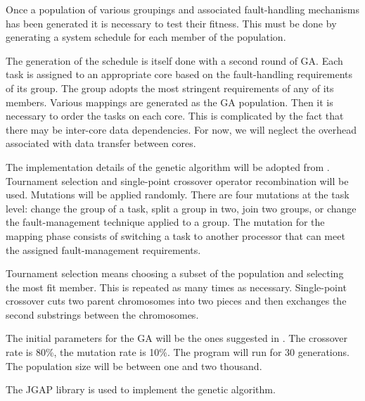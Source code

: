 Once a population of various groupings and associated fault-handling mechanisms has been generated it is necessary to test their fitness. This must be done by generating a system schedule for each member of the population. 

The generation of the schedule is itself done with a second round of GA. Each task is assigned to an appropriate core based on the fault-handling requirements of its group. The group adopts the most stringent requirements of any of its members. Various mappings are generated as the GA population. Then it is necessary to order the tasks on each core. This is complicated by the fact that there may be inter-core data dependencies. For now, we will neglect the overhead associated with data transfer between cores.

The implementation details of the genetic algorithm will be adopted from \cite{bolchini2013reliability}. Tournament selection and single-point crossover operator recombination will be used. Mutations will be applied randomly. There are four mutations at the task level: change the group of a task, split a group in two, join two groups, or change the fault-management technique applied to a group. The mutation for the mapping phase consists of switching a task to another processor that can meet the assigned fault-management requirements.

Tournament selection means choosing a subset of the population and selecting the most fit member. This is repeated as many times as necessary. Single-point crossover cuts two parent chromosomes into two pieces and then exchanges the second substrings between the chromosomes. 

The initial parameters for the GA will be the ones suggested in \cite{bolchini2010multi}. The crossover rate is 80\%, the mutation rate is 10\%. The program will run for 30 generations. The population size will be between one and two thousand.

The JGAP library \cite{jgap} is used to implement the genetic algorithm. 



